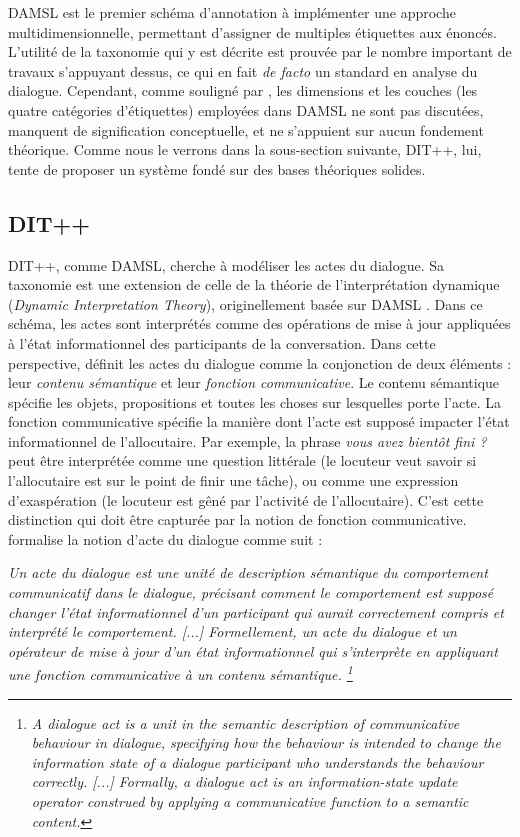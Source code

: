 \documentclass[10pt,a4paper,twoside]{article}
\begin{document}
DAMSL est le premier schéma d'annotation à implémenter une approche multidimensionnelle, permettant d'assigner de multiples étiquettes aux énoncés. L'utilité de la taxonomie qui y est décrite est prouvée par le nombre important de travaux s'appuyant dessus, ce qui en fait \textit{de facto} un standard en analyse du dialogue. Cependant, comme souligné par \citet{bunt2006dimensions}, les dimensions et les \og couches \fg{} (les quatre catégories d'étiquettes) employées dans DAMSL ne sont pas discutées, manquent de signification conceptuelle, et ne s'appuient sur aucun fondement théorique. Comme nous le verrons dans la sous-section suivante, DIT++, lui, tente de proposer un système fondé sur des bases théoriques solides.

\subsection{DIT++}
\label{subsec:DIT}

DIT++, comme DAMSL, cherche à modéliser les actes du dialogue. Sa taxonomie est une extension de celle de la théorie de l'interprétation dynamique (\textit{Dynamic Interpretation Theory}), originellement basée sur DAMSL \cite{bunt2009dit++}. Dans ce schéma, les actes sont interprétés comme des opérations de mise à jour appliquées à l'état informationnel des participants de la conversation. Dans cette perspective, \citeauthor{bunt2009dit++} définit les actes du dialogue comme la conjonction de deux éléments : leur \textit{contenu sémantique} et leur \textit{fonction communicative}. Le contenu sémantique spécifie les objets, propositions et toutes les choses sur lesquelles porte l'acte. La fonction communicative spécifie la manière dont l'acte est supposé impacter l'état informationnel de l'allocutaire. Par exemple, la phrase \og \textit{vous avez bientôt fini ?} \fg{} peut être interprétée comme une question littérale (le locuteur veut savoir si l'allocutaire est sur le point de finir une tâche), ou comme une expression d'exaspération (le locuteur est gêné par l'activité de l'allocutaire). C'est cette distinction qui doit être capturée par la notion de fonction communicative. \citeauthor{bunt2006dimensions} formalise la notion d'acte du dialogue comme suit \cite[pg. 13]{bunt2009dit++} :

\begin{displayquote}
\og \textit{Un acte du dialogue est une unité de description sémantique du comportement communicatif dans le dialogue, précisant comment le comportement est supposé changer l'état informationnel d'un participant qui aurait correctement compris et interprété le comportement. [...] Formellement, un acte du dialogue et un opérateur de mise à jour d'un état informationnel qui s’interprète en appliquant une fonction communicative à un contenu sémantique. \footnote{\textit{\og A dialogue act is a unit in the semantic description of communicative behaviour in dialogue, specifying how the behaviour is intended to change the information state of a dialogue participant who understands the behaviour correctly. [...] Formally, a dialogue act is an information-state update operator construed by applying a communicative function to a semantic content.} \fg}} \fg
\end{displayquote}
\end{document}
